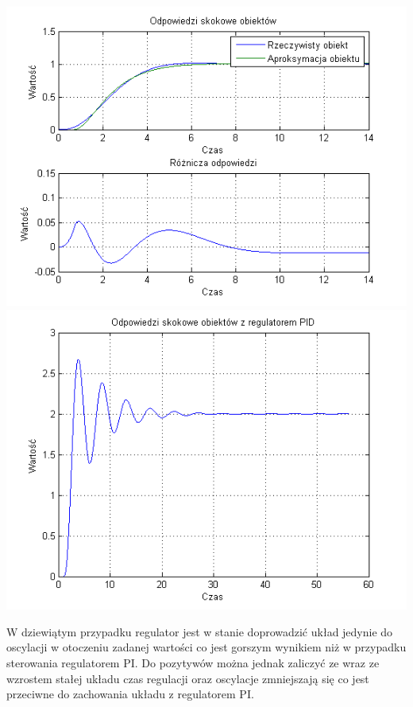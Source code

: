 \documentclass[10pt,a4paper]{article}
\begin{document}
\begin{center}
\includegraphics[scale=1]{images/dwa/skrypt_265.png}\\
\includegraphics[scale=1]{images/dwa/skrypt_266.png}\\
\end{center}
\newpage
W dziewiątym przypadku regulator jest w stanie doprowadzić układ jedynie do oscylacji w otoczeniu zadanej wartości co jest gorszym wynikiem niż w przypadku sterowania regulatorem PI. Do pozytywów można jednak zaliczyć ze wraz ze wzrostem stałej układu czas regulacji oraz oscylacje zmniejszają się co jest przeciwne do zachowania układu z regulatorem PI.
\\
\end{document}
